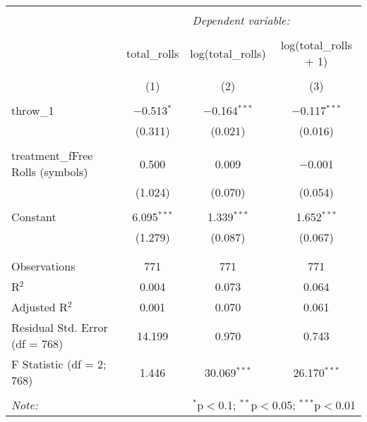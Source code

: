 
\begin{table}[!htbp] \centering 
  \caption{} 
  \label{} 
\begin{tabular}{@{\extracolsep{5pt}}lccc} 
\\[-1.8ex]\hline 
\hline \\[-1.8ex] 
 & \multicolumn{3}{c}{\textit{Dependent variable:}} \\ 
\cline{2-4} 
\\[-1.8ex] & total\_rolls & log(total\_rolls) & log(total\_rolls + 1) \\ 
\\[-1.8ex] & (1) & (2) & (3)\\ 
\hline \\[-1.8ex] 
 throw\_1 & $-$0.513$^{*}$ & $-$0.164$^{***}$ & $-$0.117$^{***}$ \\ 
  & (0.311) & (0.021) & (0.016) \\ 
  & & & \\ 
 treatment\_fFree Rolls (symbols) & 0.500 & 0.009 & $-$0.001 \\ 
  & (1.024) & (0.070) & (0.054) \\ 
  & & & \\ 
 Constant & 6.095$^{***}$ & 1.339$^{***}$ & 1.652$^{***}$ \\ 
  & (1.279) & (0.087) & (0.067) \\ 
  & & & \\ 
\hline \\[-1.8ex] 
Observations & 771 & 771 & 771 \\ 
R$^{2}$ & 0.004 & 0.073 & 0.064 \\ 
Adjusted R$^{2}$ & 0.001 & 0.070 & 0.061 \\ 
Residual Std. Error (df = 768) & 14.199 & 0.970 & 0.743 \\ 
F Statistic (df = 2; 768) & 1.446 & 30.069$^{***}$ & 26.170$^{***}$ \\ 
\hline 
\hline \\[-1.8ex] 
\textit{Note:}  & \multicolumn{3}{r}{$^{*}$p$<$0.1; $^{**}$p$<$0.05; $^{***}$p$<$0.01} \\ 
\end{tabular} 
\end{table} 
